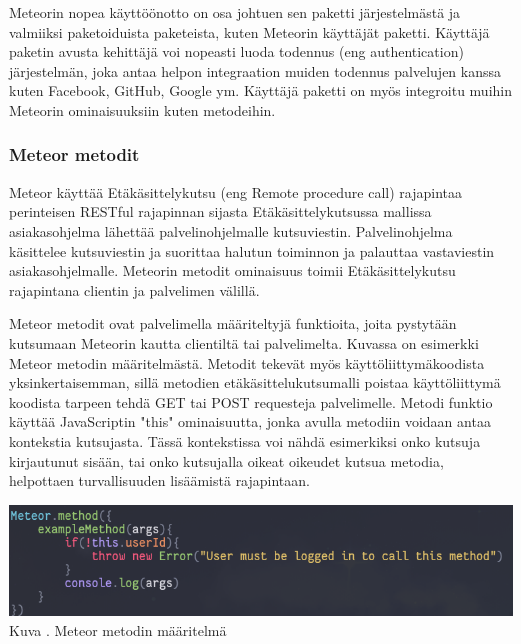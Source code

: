 Meteorin nopea käyttöönotto on osa johtuen sen paketti järjestelmästä ja valmiiksi paketoiduista paketeista, kuten Meteorin käyttäjät paketti. 
Käyttäjä paketin avusta kehittäjä voi nopeasti luoda todennus (eng authentication) järjestelmän,
joka antaa helpon integraation muiden todennus palvelujen kanssa kuten Facebook, GitHub, Google ym.
Käyttäjä paketti on myös integroitu muihin Meteorin ominaisuuksiin kuten metodeihin. 



\subsubsection{Meteor metodit}




Meteor käyttää Etäkäsittelykutsu (eng Remote procedure call) rajapintaa perinteisen RESTful rajapinnan sijasta 
Etäkäsittelykutsussa mallissa asiakasohjelma lähettää palvelinohjelmalle kutsuviestin.
Palvelinohjelma käsittelee kutsuviestin ja suorittaa halutun toiminnon ja palauttaa vastaviestin asiakasohjelmalle.
Meteorin metodit ominaisuus toimii Etäkäsittelykutsu rajapintana clientin ja palvelimen välillä. 
\medskip



Meteor metodit ovat palvelimella määriteltyjä funktioita, joita pystytään kutsumaan Meteorin kautta clientiltä tai palvelimelta. 
Kuvassa \nextImageCount{} on esimerkki Meteor metodin määritelmästä.
Metodit tekevät myös käyttöliittymäkoodista yksinkertaisemman, 
sillä metodien etäkäsittelukutsumalli poistaa käyttöliittymä koodista tarpeen tehdä GET tai POST requesteja palvelimelle.
Metodi funktio käyttää JavaScriptin "this"{} ominaisuutta, jonka
avulla metodiin voidaan antaa kontekstia kutsujasta.
Tässä kontekstissa voi nähdä esimerkiksi onko kutsuja kirjautunut sisään, tai onko kutsujalla oikeat oikeudet kutsua metodia, 
helpottaen turvallisuuden lisäämistä rajapintaan.
\bigskip

\includegraphics[width=15cm]{src/public/methodexample.png}\\
Kuva \getImgCount {}. Meteor metodin määritelmä
\medskip

